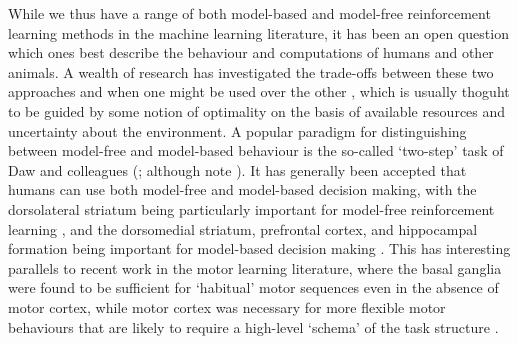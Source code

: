 While we thus have a range of both model-based and model-free reinforcement learning methods in the machine learning literature, it has been an open question which ones best describe the behaviour and computations of humans and other animals.
A wealth of research has investigated the trade-offs between these two approaches and when one might be used over the other \citep{daw2005uncertainty, geerts2020general, lengyel2007hippocampal}, which is usually thoguht to be guided by some notion of optimality on the basis of available resources and uncertainty about the environment.
A popular paradigm for distinguishing between model-free and model-based behaviour is the so-called `two-step' task of Daw and colleagues (\citealp{daw2011model,momennejad2017successor,wang2018prefrontal}; although note \citealp{akam2015simple}).
It has generally been accepted that humans can use both model-free and model-based decision making, with the dorsolateral striatum being particularly important for model-free reinforcement learning \citep{yin2004lesions, yin2005role}, and the dorsomedial striatum, prefrontal cortex, and hippocampal formation being important for model-based decision making \citep{vikbladh2019hippocampal,geerts2020general,miller2017dorsal,niv2009reinforcement,killcross2003coordination}.
This has interesting parallels to recent work in the motor learning literature, where the basal ganglia were found to be sufficient for `habitual' motor sequences even in the absence of motor cortex, while motor cortex was necessary for more flexible motor behaviours that are likely to require a high-level `schema' of the task structure \citep{mizes2023motor,mizes2023dissociating}.



